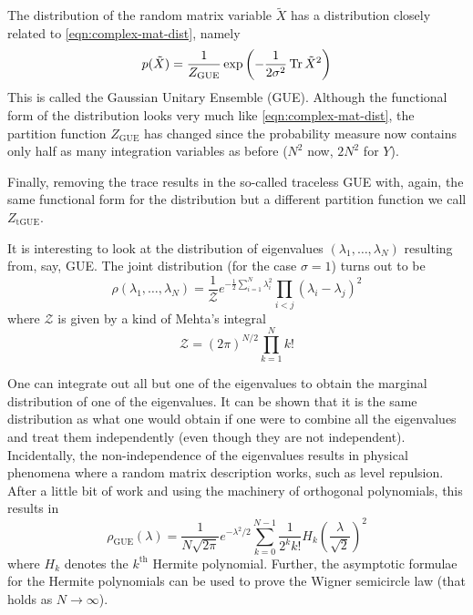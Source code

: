 The distribution of the random matrix variable $\tilde{X}$ has a distribution closely related to \cref{eqn:complex-mat-dist}, namely
\begin{equation}
  p(\tilde{X}) = \frac{1}{Z_{\mathrm{GUE}}} \exp \left( -\frac{1}{2 \sigma^2} \Tr \tilde{X}^2 \right)
\end{equation}
This is called the Gaussian Unitary Ensemble (GUE). Although the functional form of the distribution looks very much like \cref{eqn:complex-mat-dist}, the partition function $Z_{\mathrm{GUE}}$ has changed since the probability measure now contains only half as many integration variables as before ($N^2$ now, $2N^2$ for $Y$).

Finally, removing the trace results in the so-called traceless GUE with, again, the same functional form for the distribution but a different partition function we call $Z_\mathrm{tGUE}$.

It is interesting to look at the distribution of eigenvalues $\left( \lambda_1, \ldots, \lambda_N \right)$ resulting from, say, GUE. The joint distribution (for the case $\sigma = 1$) turns out to be
\begin{equation}
  \rho(\lambda_1, \ldots, \lambda_N) = \frac{1}{\mathcal{Z}} e^{-\frac{1}{2} \sum_{i = 1}^{N} \lambda_i^2} \prod_{i < j} (\lambda_i - \lambda_j)^2
\end{equation}
where $\mathcal{Z}$ is given by a kind of Mehta's integral
\begin{equation}
  \mathcal{Z} = (2 \pi)^{N/2} \prod_{k = 1}^{N} k!
\end{equation}

One can integrate out all but one of the eigenvalues to obtain the marginal distribution of one of the eigenvalues. It can be shown that it is the same distribution as what one would obtain if one were to combine all the eigenvalues and treat them independently (even though they are not independent). Incidentally, the non-independence of the eigenvalues results in physical phenomena where a random matrix description works, such as level repulsion. After a little bit of work and using the machinery of orthogonal polynomials, this results in
\begin{equation}
  \rho_{\mathrm{GUE}}(\lambda) = \frac{1}{N \sqrt{2\pi}} e^{-\lambda^2/2} \sum_{k = 0}^{N-1} \frac{1}{2^k k!} H_k\left(\frac{\lambda}{\sqrt{2}}\right)^2
\end{equation}
where $H_k$ denotes the $k^\mathrm{th}$ Hermite polynomial. Further, the asymptotic formulae for the Hermite polynomials can be used to prove the Wigner semicircle law (that holds as $N \to \infty$).

